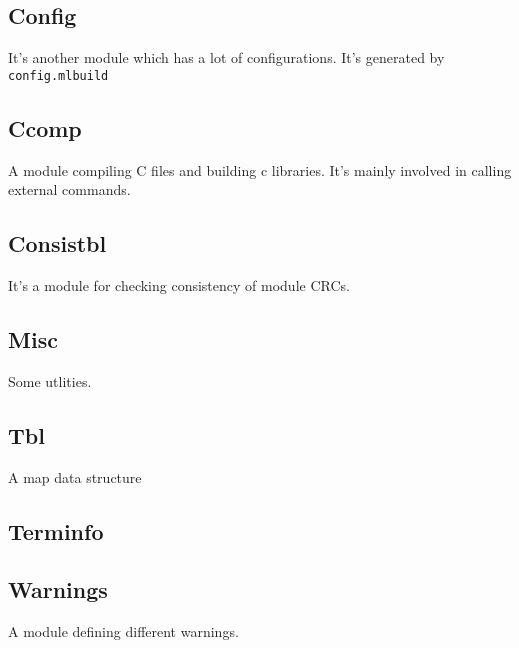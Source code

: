 \subsection{Config}
It's another module which has a lot of configurations. It's generated
by \verb|config.mlbuild|

\subsection{Ccomp}
A module compiling C files and building c libraries. It's mainly
involved in calling external commands.


\subsection{Consistbl}
It's a module for checking consistency of module CRCs.

\subsection{Misc}
Some utlities.

\subsection{Tbl}
A map data structure


\subsection{Terminfo}

\subsection{Warnings}

A module defining different warnings.
